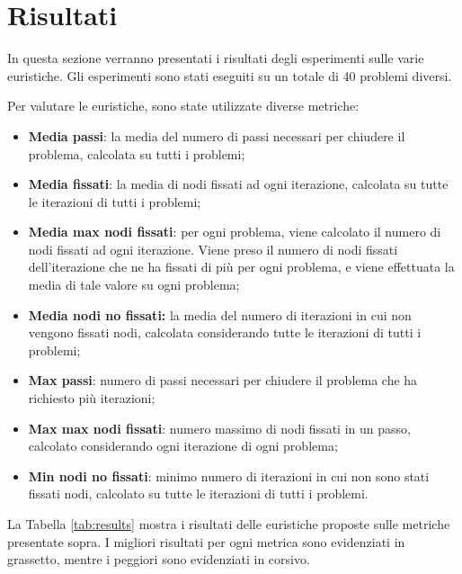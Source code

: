 \section{Risultati}
\label{sec:risultati}

In questa sezione verranno presentati i risultati degli esperimenti sulle varie euristiche. Gli esperimenti sono stati eseguiti su un totale di 40 problemi diversi. 

Per valutare le euristiche, sono state utilizzate diverse metriche:

\begin{itemize}
\item \textbf{Media passi}: la media del numero di passi necessari per chiudere il problema, calcolata su tutti i problemi;
\item \textbf{Media fissati}: la media di nodi fissati ad ogni iterazione, calcolata su tutte le iterazioni di tutti i problemi;
\item \textbf{Media max nodi fissati}: per ogni problema, viene calcolato il numero di nodi fissati ad ogni iterazione. Viene preso il numero di nodi fissati dell'iterazione che ne ha fissati di più per ogni problema, e viene effettuata la media di tale valore su ogni problema;
\item \textbf{Media nodi no fissati:} la media del numero di iterazioni in cui non vengono fissati nodi, calcolata considerando tutte le iterazioni di tutti i problemi;
\item \textbf{Max passi}: numero di passi necessari per chiudere il problema che ha richiesto più iterazioni;
\item \textbf{Max max nodi fissati}: numero massimo di nodi fissati in un passo, calcolato considerando ogni iterazione di ogni problema;
\item \textbf{Min nodi no fissati}: minimo numero di iterazioni in cui non sono stati fissati nodi, calcolato su tutte le iterazioni di tutti i problemi.
\end{itemize}

La Tabella \ref{tab:results} mostra i risultati delle euristiche proposte sulle metriche presentate sopra. I migliori risultati per ogni metrica sono evidenziati in grassetto, mentre i peggiori sono evidenziati in corsivo. 

